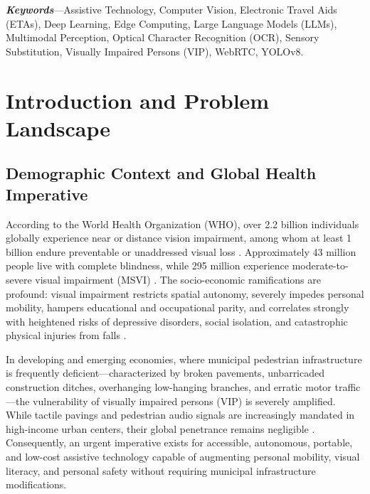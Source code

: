 \documentclass[10pt,twocolumn]{article}
\begin{document}
\textbf{\textit{Keywords}}---Assistive Technology, Computer Vision, Electronic Travel Aids (ETAs), Deep Learning, Edge Computing, Large Language Models (LLMs), Multimodal Perception, Optical Character Recognition (OCR), Sensory Substitution, Visually Impaired Persons (VIP), WebRTC, YOLOv8.

\section{Introduction and Problem Landscape}
\label{sec:intro}

\subsection{Demographic Context and Global Health Imperative}
According to the World Health Organization (WHO), over 2.2 billion individuals globally experience near or distance vision impairment, among whom at least 1 billion endure preventable or unaddressed visual loss \cite{who_vision_report}. Approximately 43 million people live with complete blindness, while 295 million experience moderate-to-severe visual impairment (MSVI) \cite{bourne2021trends}. The socio-economic ramifications are profound: visual impairment restricts spatial autonomy, severely impedes personal mobility, hampers educational and occupational parity, and correlates strongly with heightened risks of depressive disorders, social isolation, and catastrophic physical injuries from falls \cite{marquez2019impact, roentgen2008inventory}.

In developing and emerging economies, where municipal pedestrian infrastructure is frequently deficient---characterized by broken pavements, unbarricaded construction ditches, overhanging low-hanging branches, and erratic motor traffic---the vulnerability of visually impaired persons (VIP) is severely amplified. While tactile pavings and pedestrian audio signals are increasingly mandated in high-income urban centers, their global penetrance remains negligible \cite{manduchi2012last}. Consequently, an urgent imperative exists for accessible, autonomous, portable, and low-cost assistive technology capable of augmenting personal mobility, visual literacy, and personal safety without requiring municipal infrastructure modifications.
\end{document}
